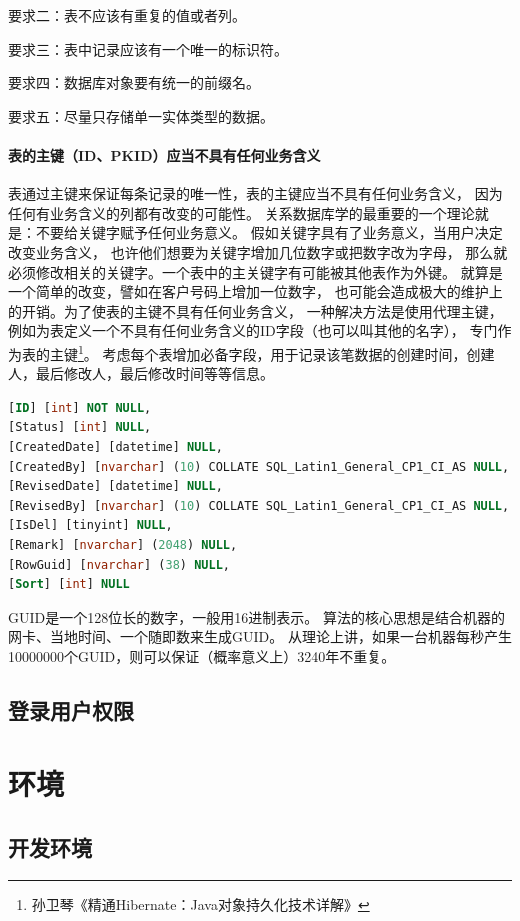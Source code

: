 \documentclass{book}
\begin{document}
要求二：表不应该有重复的值或者列。

要求三：表中记录应该有一个唯一的标识符。

要求四：数据库对象要有统一的前缀名。

要求五：尽量只存储单一实体类型的数据。

\paragraph{表的主键（ID、PKID）应当不具有任何业务含义}

表通过主键来保证每条记录的唯一性，表的主键应当不具有任何业务含义，
因为任何有业务含义的列都有改变的可能性。
关系数据库学的最重要的一个理论就是：不要给关键字赋予任何业务意义。
假如关键字具有了业务意义，当用户决定改变业务含义，
也许他们想要为关键字增加几位数字或把数字改为字母，
那么就必须修改相关的关键字。一个表中的主关键字有可能被其他表作为外键。
就算是一个简单的改变，譬如在客户号码上增加一位数字，
也可能会造成极大的维护上的开销。为了使表的主键不具有任何业务含义，
一种解决方法是使用代理主键，
例如为表定义一个不具有任何业务含义的ID字段（也可以叫其他的名字），
专门作为表的主键\footnote{孙卫琴《精通Hibernate：Java对象持久化技术详解》}。
考虑每个表增加必备字段，用于记录该笔数据的创建时间，创建人，最后修改人，最后修改时间等等信息。

\begin{lstlisting}[language=SQL]
[ID] [int] NOT NULL,
[Status] [int] NULL,
[CreatedDate] [datetime] NULL,
[CreatedBy] [nvarchar] (10) COLLATE SQL_Latin1_General_CP1_CI_AS NULL,
[RevisedDate] [datetime] NULL,
[RevisedBy] [nvarchar] (10) COLLATE SQL_Latin1_General_CP1_CI_AS NULL,
[IsDel] [tinyint] NULL,
[Remark] [nvarchar] (2048) NULL,
[RowGuid] [nvarchar] (38) NULL,
[Sort] [int] NULL
\end{lstlisting}

GUID是一个128位长的数字，一般用16进制表示。
算法的核心思想是结合机器的网卡、当地时间、一个随即数来生成GUID。
从理论上讲，如果一台机器每秒产生10000000个GUID，则可以保证（概率意义上）3240年不重复。

\subsection{登录用户权限}


\section{环境}

\subsection{开发环境}
\end{document}
